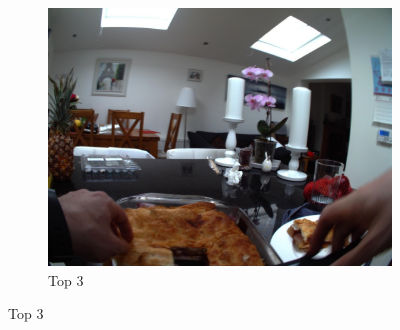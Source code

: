 \begin{figure}[H]
\begin{subfigure}{0.32\textwidth}
    \includegraphics[width=\textwidth]{Sections/7Results/images/top3.jpg}\hfill
    \caption{Top 3}
  \end{subfigure} \par\medskip


\end{figure}
